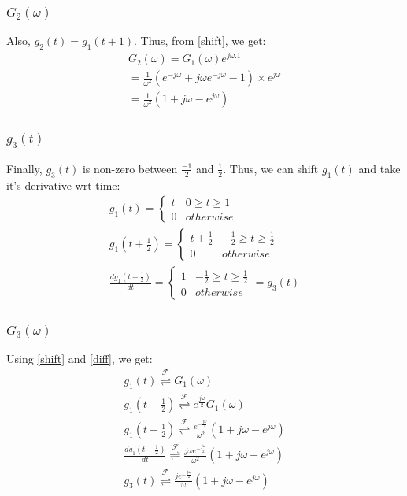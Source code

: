 \documentclass{beamer}
\providecommand{\brak}[1]{\ensuremath{\left(#1\right)}}
\providecommand{\fourier}{\overset{\mathcal{F}}{ \rightleftharpoons}}
\begin{document}
\begin{frame}
    \frametitle{$G_2(\omega)$}
    \begin{flushleft}
    Also, $g_2(t) = g_1(t + 1)$. Thus, from \eqref{shift}, we get:
\begin{align}
    G_2(\omega) = G_1(\omega)e^{j\omega.1} \\ =\frac{1}{\omega^2}(e^{-j\omega} + j\omega e^{-j\omega} - 1) \times e^{j\omega}\\
    =\frac{1}{\omega^2}(1 + j\omega - e^{j\omega})
\end{align}
  \end{flushleft}
\end{frame}


\begin{frame}
    \frametitle{$g_3(t)$}
    \begin{flushleft}
    
Finally, $g_3(t)$ is non-zero between $\frac{-1}{2}$ and $\frac{1}{2}$. Thus, we can shift $g_1(t)$ and take it's derivative wrt time:
\begin{align}
    g_1(t) = 
    \begin{cases}
    t & 0 \geq t \geq 1\\
    0 & otherwise
    \end{cases}\\
    g_1\brak{t + \frac{1}{2}} = 
    \begin{cases}
    t + \frac{1}{2} & -\frac{1}{2} \geq t \geq \frac{1}{2}\\
    0 & otherwise
    \end{cases}\\
    \frac{dg_1\brak{t + \frac{1}{2}}}{dt} = 
    \begin{cases}
    1 & -\frac{1}{2} \geq t \geq \frac{1}{2}\\
    0 & otherwise
    \end{cases} = g_3(t)
\end{align}
\end{flushleft}
\end{frame}


\begin{frame}
    \frametitle{$G_3(\omega)$}
    \begin{flushleft}
Using \eqref{shift} and \eqref{diff}, we get:
\begin{align}
    g_1(t) \fourier G_1(\omega)\\
    g_1\brak{t + \frac{1}{2}}\fourier e^{\frac{j\omega}{2}}G_1(\omega) \\g_1\brak{t + \frac{1}{2}}\fourier\frac{e^{-\frac{j\omega}{2}}}{\omega^2}(1 + j\omega  - e^{j\omega})\\
    \frac{dg_1\brak{t + \frac{1}{2}}}{dt} \fourier \frac{j\omega e^{-\frac{j\omega}{2}}}{\omega^2}(1 + j\omega  - e^{j\omega})\\
    g_3(t) \fourier \frac{j e^{-\frac{j\omega}{2}}}{\omega}(1 + j\omega  - e^{j\omega})
\end{align}
    \end{flushleft}
\end{frame}
\end{document}
